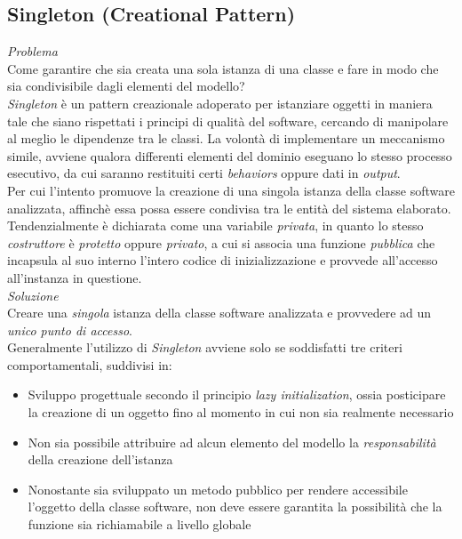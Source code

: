 \documentclass{article}
\begin{document}
\subsection*{Singleton (Creational Pattern)}
\large 
\textit{Problema}\\
Come garantire che sia creata una sola istanza di una classe e fare in modo che sia condivisibile dagli elementi del modello?\vspace*{14pt}\\
\textit{Singleton} è un pattern creazionale adoperato per istanziare oggetti in maniera tale che siano rispettati i principi di qualità del software, cercando di manipolare al meglio le dipendenze tra le classi. La volontà di implementare un meccanismo simile, avviene qualora differenti elementi del dominio eseguano lo stesso processo esecutivo, da cui saranno restituiti certi \textit{behaviors} oppure dati in \textit{output}.\vspace*{14pt}\\
Per cui l'intento promuove la creazione di una singola istanza della classe software analizzata, affinchè essa possa essere condivisa tra le entità del sistema elaborato. Tendenzialmente è dichiarata come una variabile \textit{privata}, in quanto lo stesso \textit{costruttore} è \textit{protetto} oppure \textit{privato}, a cui si associa una funzione \textit{pubblica} che incapsula al suo interno l'intero codice di inizializzazione e provvede all'accesso all'instanza in questione.\vspace*{14pt}\\
\textit{Soluzione}\\
Creare una \textit{singola} istanza della classe software analizzata e provvedere ad un \textit{unico punto di accesso}.\vspace*{14pt}\\
Generalmente l'utilizzo di \textit{Singleton} avviene solo se soddisfatti tre criteri comportamentali, suddivisi in:
\begin{itemize}[label={-}]
    \itemsep0em
    \item Sviluppo progettuale secondo il principio \textit{lazy initialization}, ossia posticipare la creazione di un oggetto fino al momento in cui non sia realmente necessario 
    \item Non sia possibile attribuire ad alcun elemento del modello la \textit{responsabilità} della creazione dell'istanza
    \item Nonostante sia sviluppato un metodo pubblico per rendere accessibile l'oggetto della classe software, non deve essere garantita la possibilità che la funzione sia richiamabile a livello globale
\end{itemize}
\end{document}
